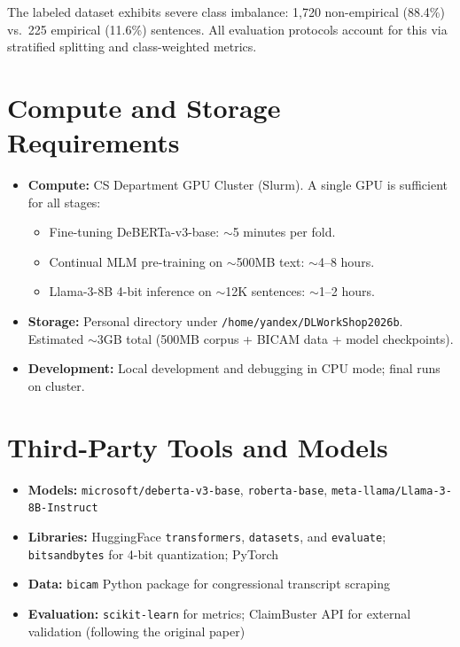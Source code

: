 \documentclass[11pt,a4paper]{article}
\begin{document}
The labeled dataset exhibits severe class imbalance: 1,720 non-empirical (88.4\%) vs.\ 225 empirical (11.6\%) sentences. All evaluation protocols account for this via stratified splitting and class-weighted metrics.

\section{Compute and Storage Requirements}

\begin{itemize}[nosep]
  \item \textbf{Compute:} CS Department GPU Cluster (Slurm). A single GPU is sufficient for all stages:
  \begin{itemize}[nosep]
    \item Fine-tuning DeBERTa-v3-base: $\sim$5 minutes per fold.
    \item Continual MLM pre-training on $\sim$500MB text: $\sim$4--8 hours.
    \item Llama-3-8B 4-bit inference on $\sim$12K sentences: $\sim$1--2 hours.
  \end{itemize}
  \item \textbf{Storage:} Personal directory under \texttt{/home/yandex/DLWorkShop2026b}. Estimated $\sim$3GB total (500MB corpus + BICAM data + model checkpoints).
  \item \textbf{Development:} Local development and debugging in CPU mode; final runs on cluster.
\end{itemize}

\section{Third-Party Tools and Models}

\begin{itemize}[nosep]
  \item \textbf{Models:} \texttt{microsoft/deberta-v3-base}, \texttt{roberta-base}, \texttt{meta-llama/Llama-3-8B-Instruct}
  \item \textbf{Libraries:} HuggingFace \texttt{transformers}, \texttt{datasets}, and \texttt{evaluate}; \texttt{bitsandbytes} for 4-bit quantization; PyTorch
  \item \textbf{Data:} \texttt{bicam} Python package for congressional transcript scraping
  \item \textbf{Evaluation:} \texttt{scikit-learn} for metrics; ClaimBuster API for external validation (following the original paper)
\end{itemize}
\end{document}
